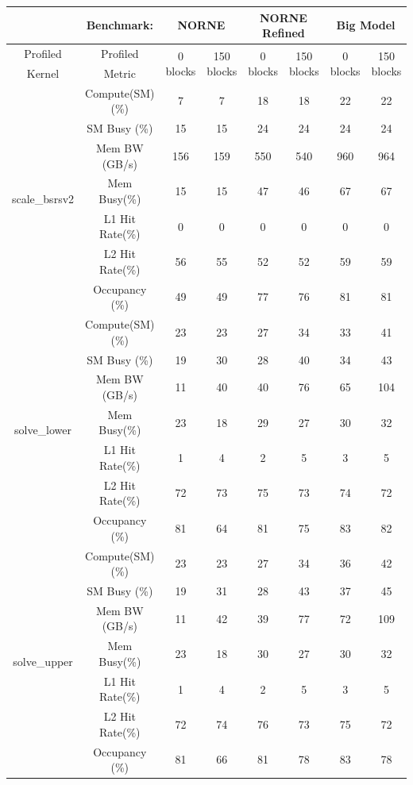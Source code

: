 \begin{table}[!h]
\centering
\begin{tabular}{c|c|c|c|c|c|c|c}
& Benchmark: & \multicolumn{2}{|c|}{NORNE} &\multicolumn{2}{|c|}{NORNE Refined} & \multicolumn{2}{|c}{Big Model} \\\hline
Profiled & Profiled & \multirow{2}{*}{0 blocks} & \multirow{2}{*}{150 blocks} & \multirow{2}{*}{0 blocks} & \multirow{2}{*}{150 blocks} & \multirow{2}{*}{0 blocks} & \multirow{2}{*}{150 blocks} \\ 
Kernel & Metric & & & & & & \\\hline\hline
\multirow{7}{*}{scale\_bsrsv2} & Compute(SM)(\%) & 7 & 7 & 18 & 18 & 22 & 22\\
 & SM Busy (\%) & 15 & 15 & 24 & 24 & 24 & 24 \\
 & Mem BW (GB/s) & 156 & 159 & 550 & 540 & 960 & 964\\
 & Mem Busy(\%) & 15 & 15 & 47 & 46 & 67 & 67\\
 & L1 Hit Rate(\%) & 0 & 0 & 0 & 0 & 0 & 0\\
 & L2 Hit Rate(\%) & 56 & 55 & 52 & 52 & 59 & 59\\
 & Occupancy (\%) & 49 & 49 & 77 & 76 & 81 & 81\\\hline
\multirow{7}{*}{solve\_lower} & Compute(SM)(\%) & 23 & 23 & 27 & 34 & 33 & 41 \\
 & SM Busy (\%) & 19 & 30 & 28 & 40 & 34 & 43\\
 & Mem BW (GB/s) & 11 & 40 & 40 & 76 & 65 & 104\\
 & Mem Busy(\%) & 23 & 18 & 29 & 27 & 30 & 32\\
 & L1 Hit Rate(\%) & 1 & 4 & 2 & 5 & 3 & 5\\
 & L2 Hit Rate(\%) & 72 & 73 & 75 & 73 & 74 & 72\\
 & Occupancy (\%) & 81 & 64 & 81 & 75 & 83 & 82\\\hline
\multirow{7}{*}{solve\_upper} & Compute(SM)(\%) & 23 & 23 & 27 & 34 & 36 & 42\\
 & SM Busy (\%) & 19 & 31 & 28 & 43 & 37 & 45\\
 & Mem BW (GB/s) & 11 & 42 & 39 & 77 & 72 & 109\\
 & Mem Busy(\%) & 23 & 18 & 30 & 27 & 30 & 32\\
 & L1 Hit Rate(\%) & 1 & 4 & 2 & 5 & 3 & 5\\
 & L2 Hit Rate(\%) & 72 & 74 & 76 & 73 & 75 & 72\\
 & Occupancy (\%) & 81 & 66 & 81 & 78 & 83 & 78\\\hline

\end{tabular}
\end{table}
